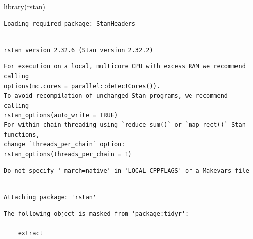 \documentclass[
  12pt,
]{article}
\newenvironment{Shaded}{\begin{snugshade}}{\end{snugshade}}
\newcommand{\FunctionTok}[1]{\textcolor[rgb]{0.28,0.35,0.67}{#1}}
\newcommand{\NormalTok}[1]{\textcolor[rgb]{0.00,0.23,0.31}{#1}}
\begin{document}
\begin{Shaded}
\begin{Highlighting}[]
\FunctionTok{library}\NormalTok{(rstan)}
\end{Highlighting}
\end{Shaded}

\begin{verbatim}
Loading required package: StanHeaders
\end{verbatim}

\begin{verbatim}

rstan version 2.32.6 (Stan version 2.32.2)
\end{verbatim}

\begin{verbatim}
For execution on a local, multicore CPU with excess RAM we recommend calling
options(mc.cores = parallel::detectCores()).
To avoid recompilation of unchanged Stan programs, we recommend calling
rstan_options(auto_write = TRUE)
For within-chain threading using `reduce_sum()` or `map_rect()` Stan functions,
change `threads_per_chain` option:
rstan_options(threads_per_chain = 1)
\end{verbatim}

\begin{verbatim}
Do not specify '-march=native' in 'LOCAL_CPPFLAGS' or a Makevars file
\end{verbatim}

\begin{verbatim}

Attaching package: 'rstan'
\end{verbatim}

\begin{verbatim}
The following object is masked from 'package:tidyr':

    extract
\end{verbatim}
\end{document}
